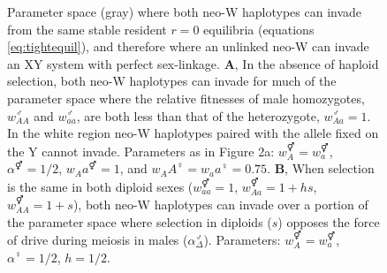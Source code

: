 \documentclass[12pt]{article}
\begin{document}
\begin{figure}[!h]
\centering
{}
\caption{
Parameter space (gray) where both neo-W haplotypes can invade from the same stable resident $r=0$ equilibria (equations \ref{eq:tightequil}), and therefore where an unlinked neo-W can invade an XY system with perfect sex-linkage.
\textbf{A}, In the absence of haploid selection, both neo-W haplotypes can invade for much of the parameter space where the relative fitnesses of male homozygotes, $w_{AA}^\male$ and $w_{aa}^\male$, are both less than that of the heterozygote, $w_{Aa}^\male = 1$.
In the white region neo-W haplotypes paired with the allele fixed on the Y cannot invade.
Parameters as in \cite{Otto2014} Figure 2a: $w_A^\Hermaphrodite=w_a^\Hermaphrodite$, $\alpha^\Hermaphrodite=1/2$, $w_Aa^\Hermaphrodite=1$, and $w_AA^\female=w_aa^\female=0.75$.
\textbf{B}, When selection is the same in both diploid sexes ($w_{aa}^\Hermaphrodite = 1$, $w_{Aa}^\Hermaphrodite = 1 + h s$, $w_{AA}^\Hermaphrodite = 1+s$), both neo-W haplotypes can invade over a portion of the parameter space where selection in diploids ($s$) opposes the force of drive during meiosis in males ($\alpha_{\Delta}^\male$).
Parameters: $w_A^\Hermaphrodite=w_a^\Hermaphrodite$, $\alpha^\female=1/2$, $h=1/2$.
}
\label{fig:regionplot_2a}
\end{figure}
\end{document}
